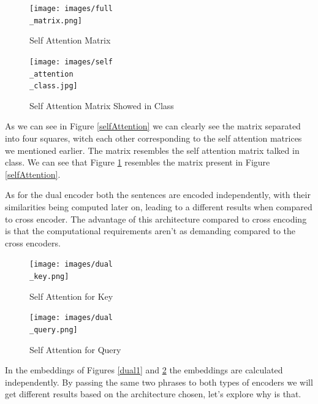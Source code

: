 \documentclass[runningheads]{llncs}
\begin{document}
\begin{figure}[htbp]
    \centering
    \begin{minipage}{0.50\textwidth}
        \centering
        \texttt{[image: images/full\\\_matrix.png]}
        \caption{Self Attention Matrix}
        \label{selfAttention}
    \end{minipage}\hfill
    \begin{minipage}{0.4\textwidth}
        \centering
        \texttt{[image: images/self\\\_attention\\\_class.jpg]}
        \caption{Self Attention Matrix Showed in Class}
         \label{selfAttentionClass}
    \end{minipage}
\end{figure}

As we can see in Figure \ref{selfAttention} we can clearly see the matrix separated into four squares, witch each other corresponding to the self attention matrices we mentioned earlier. The matrix resembles the self attention matrix talked in class. We can see that Figure \ref{selfAttentionClass} resembles the matrix present in Figure \ref{selfAttention}.

As for the dual encoder both the sentences are encoded independently, with their similarities being computed later on, leading to a different results when compared to cross encoder. The advantage of this architecture compared to cross encoding is that the computational requirements aren't as demanding compared to the cross encoders. 

\begin{figure}[htbp]
    \centering
    \begin{minipage}{0.50\textwidth}
        \centering
        \texttt{[image: images/dual\\\_key.png]}
        \caption{Self Attention for Key}
         \label{dual1}
    \end{minipage}\hfill
    \begin{minipage}{0.50\textwidth}
        \centering
        \texttt{[image: images/dual\\\_query.png]}
        \caption{Self Attention for Query}
         \label{dual2}
    \end{minipage}
\end{figure}

In the embeddings of Figures \ref{dual1} and \ref{dual2} the embeddings are calculated independently.
By passing the same two phrases to both types of encoders we will get different results based on the architecture chosen, let's explore why is that.\\[5pt]
\end{document}
